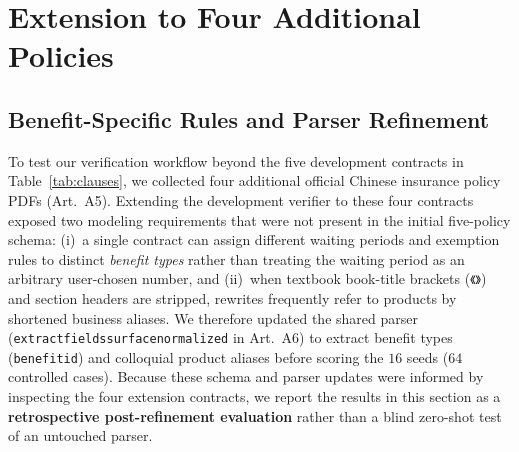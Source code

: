 \documentclass[10pt,twocolumn]{article}
\renewcommand{\_}{\textunderscore\allowbreak}
\begin{document}
\section{Extension to Four Additional Policies}
\label{sec:heldout_policies}

\subsection{Benefit-Specific Rules and Parser Refinement}
To test our verification workflow beyond the five development contracts in Table~\ref{tab:clauses}, we collected four additional official Chinese insurance policy PDFs (Art.~A5). Extending the development verifier to these four contracts exposed two modeling requirements that were not present in the initial five-policy schema: (i)~a single contract can assign different waiting periods and exemption rules to distinct \emph{benefit types} rather than treating the waiting period as an arbitrary user-chosen number, and (ii)~when textbook book-title brackets (\texttt{《》}) and section headers are stripped, rewrites frequently refer to products by shortened business aliases. We therefore updated the shared parser (\texttt{extract\_fields\_surface\_normalized} in Art.~A6) to extract benefit types (\texttt{benefit\_id}) and colloquial product aliases before scoring the $16$ seeds ($64$ controlled cases). Because these schema and parser updates were informed by inspecting the four extension contracts, we report the results in this section as a \textbf{retrospective post-refinement evaluation} rather than a blind zero-shot test of an untouched parser.
\end{document}
